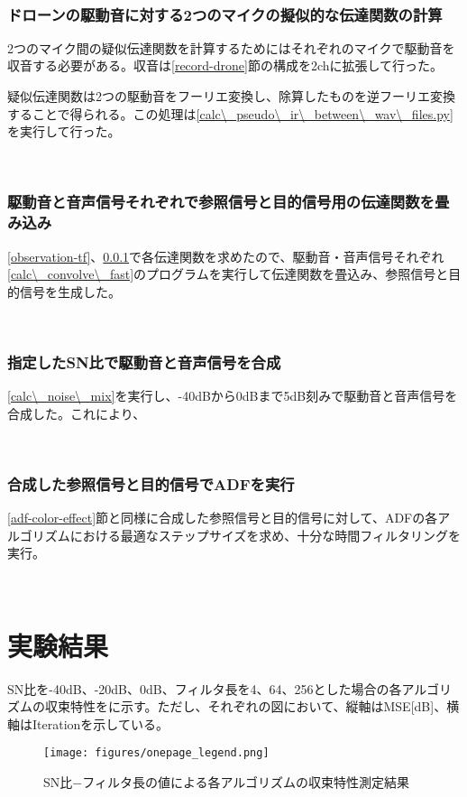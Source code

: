 \
\subsubsection{ドローンの駆動音に対する2つのマイクの擬似的な伝達関数の計算}\label{pseudo-tf}

2つのマイク間の疑似伝達関数を計算するためにはそれぞれのマイクで駆動音を収音する必要がある。収音は\ref{record-drone}節の構成を2chに拡張して行った。

疑似伝達関数は2つの駆動音をフーリエ変換し、除算したものを逆フーリエ変換することで得られる。この処理は\ref{calc\_pseudo\_ir\_between\_wav\_files.py}を実行して行った。

\
\subsubsection{駆動音と音声信号それぞれで参照信号と目的信号用の伝達関数を畳み込み}\label{convolve-each}

\ref{observation-tf}、\ref{pseudo-tf}で各伝達関数を求めたので、駆動音・音声信号それぞれ\ref{calc\_convolve\_fast}のプログラムを実行して伝達関数を畳込み、参照信号と目的信号を生成した。

\
\subsubsection{指定したSN比で駆動音と音声信号を合成}\label{mix-snr}

\ref{calc\_noise\_mix}を実行し、-40dBから0dBまで5dB刻みで駆動音と音声信号を合成した。これにより、

\
\subsubsection{合成した参照信号と目的信号でADFを実行}\label{exec-adf}

\ref{adf-color-effect}節と同様に合成した参照信号と目的信号に対して、ADFの各アルゴリズムにおける最適なステップサイズを求め、十分な時間フィルタリングを実行。

\
\section{実験結果}\label{result-practice}

SN比を-40dB、-20dB、0dB、フィルタ長を4、64、256とした場合の各アルゴリズムの収束特性を\figref{fig:onepage}に示す。ただし、それぞれの図において、縦軸はMSE{[}dB{]}、横軸はIterationを示している。

\begin{figure}[H]
\centering
\texttt{[image: figures/onepage\_legend.png]}
\label{fig:onepage}
\caption{SN比−フィルタ長の値による各アルゴリズムの収束特性測定結果}
\end{figure}

